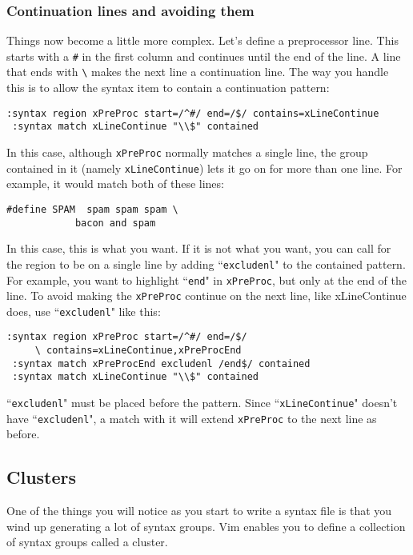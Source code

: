 \subsubsection{Continuation lines and avoiding them}
Things now become a little more complex.
Let's define a preprocessor line.
This starts with a \texttt{\#} in the first column and continues until the end of the line.
A line that ends with \texttt{\textbackslash{}} makes the next line a continuation line.
The way you handle this is to allow the syntax item to contain a continuation pattern:

\begin{Verbatim}[samepage=true]
 :syntax region xPreProc start=/^#/ end=/$/ contains=xLineContinue
 :syntax match xLineContinue "\\$" contained
\end{Verbatim}

In this case, although \texttt{xPreProc} normally matches a single line, the group contained in it (namely \texttt{xLineContinue}) lets it go on for more than one line.
For example, it would match both of these lines:

\begin{Verbatim}[samepage=true]
    #define SPAM  spam spam spam \ 
            bacon and spam 
\end{Verbatim}

In this case, this is what you want.
If it is not what you want, you can call for the region to be on a single line by adding ``\texttt{excludenl}" to the contained pattern.
For example, you want to highlight ``\texttt{end}" in \texttt{xPreProc}, but only at the end of the line.
To avoid making the \texttt{xPreProc} continue on the next line, like xLineContinue does, use ``\texttt{excludenl}" like this:

\begin{Verbatim}[samepage=true]
 :syntax region xPreProc start=/^#/ end=/$/
     \ contains=xLineContinue,xPreProcEnd
 :syntax match xPreProcEnd excludenl /end$/ contained
 :syntax match xLineContinue "\\$" contained
\end{Verbatim}

``\texttt{excludenl}" must be placed before the pattern.
Since ``\texttt{xLineContinue}" doesn't have ``\texttt{excludenl}", a match with it will extend \texttt{xPreProc} to the next line as before.
\subsection{Clusters}
\label{Clusters}
One of the things you will notice as you start to write a syntax file is that you wind up generating a lot of syntax groups.
Vim enables you to define a collection of syntax groups called a cluster.

